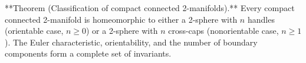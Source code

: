 **Theorem (Classification of compact connected 2-manifolds).** Every compact connected 2-manifold is homeomorphic to either a 2-sphere with $n$ handles (orientable case, $n \geqslant 0$) or a 2-sphere with $n$ cross-caps (nonorientable case, $n \geqslant 1$). The Euler characteristic, orientability, and the number of boundary components form a complete set of invariants.
